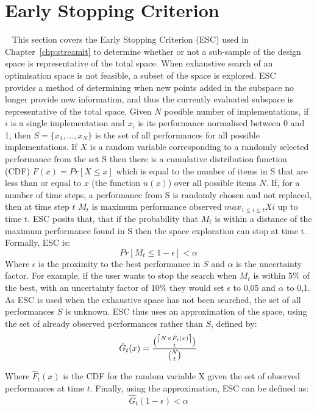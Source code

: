 \section{Early Stopping Criterion}~\label{sec:esc}
This section covers the Early Stopping Criterion (ESC) used in Chapter~\ref{chp:streamit} to determine whether or not a sub-sample of the design space is representative of the total space.
When exhaustive search of an optimisation space is not feasible, a subset of the space is explored.
ESC~\cite{vuduc2003AutomaticPerf} provides a method of determining when new points added in the subspace no longer provide new information, and thus the currently evaluated subspace is representative of the total space.
Given $N$ possible number of implementations, if $i$ is a single implementation and $x_i$ is its performance normalised between 0 and 1, then $S=\{x_1,...,x_N\}$ is the set of all performances for all possible implementations.
If $X$ is a random variable corresponding to a randomly selected performance from the set S then there is a cumulative distribution function (CDF) $F(x) = Pr[X \le x]$ which is equal to the number of items in S that are less than or equal to $x$ (the function $n(x)$) over all possible items $N$.
If, for a number of time steps, a performance from S is randomly chosen and not replaced, then at time step $t$ $M_t$ is maximum performance observed $max_{1\le i \le t} Xi$ up to time t.
ESC posits that, that if the probability that $M_t$ is within a distance of the maximum performance found in S then the space exploration can stop at time t.
Formally, ESC is:
\begin{equation}
Pr[M_t \le 1 - \epsilon ] < \alpha
\end{equation}
Where $\epsilon$ is the proximity to the best performance in $S$ and $\alpha$ is the uncertainty factor.
For example, if the user wants to stop the search when $M_t$ is within 5\% of the best, with an uncertainty factor of 10\% they would set $\epsilon$ to 0,05 and $\alpha$ to 0,1.
As ESC is used when the exhaustive space has not been searched, the set of all performances $S$ is unknown.
ESC thus uses an approximation of the space, using the set of already observed performances rather than $S$, defined by:
\begin{equation}
\hat{G}_t(x) = \frac{ \binom{\ceil*{N \times \hat{F}_t(x)}}{t}}{\binom{N}{t}}
\end{equation}

Where $\hat{F}_t(x)$ is the CDF for the random variable X given the set of observed performances at time $t$.
Finally, using the approximation, ESC can be defined as:
\begin{equation}
\hat{G}_t(1-\epsilon) < \alpha
\end{equation}
